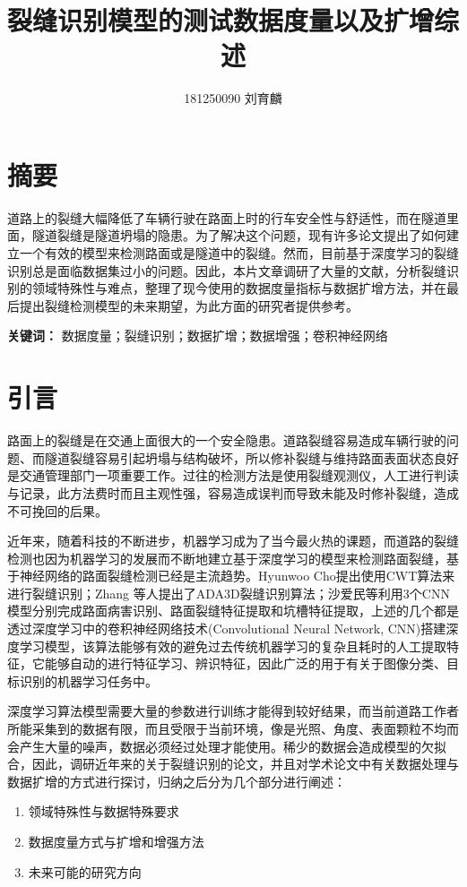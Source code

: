 \documentclass[a4paper,UTF8]{article}
\theoremstyle{definition}
\begin{document}
	\title{裂缝识别模型的测试数据度量以及扩增综述}
	\author{181250090 刘育麟}
	\date{}
	\maketitle
	\section*{摘要}
	道路上的裂缝大幅降低了车辆行驶在路面上时的行车安全性与舒适性，而在隧道里面，隧道裂缝是隧道坍塌的隐患。为了解决这个问题，现有许多论文提出了如何建立一个有效的模型来检测路面或是隧道中的裂缝。然而，目前基于深度学习的裂缝识别总是面临数据集过小的问题。因此，本片文章调研了大量的文献，分析裂缝识别的领域特殊性与难点，整理了现今使用的数据度量指标与数据扩增方法，并在最后提出裂缝检测模型的未来期望，为此方面的研究者提供参考。
	
	\textbf{关键词：} 数据度量；裂缝识别；数据扩增；数据增强；卷积神经网络
	
	\section{引言}
	路面上的裂缝是在交通上面很大的一个安全隐患。道路裂缝容易造成车辆行驶的问题、而隧道裂缝容易引起坍塌与结构破坏，所以修补裂缝与维持路面表面状态良好是交通管理部门一项重要工作。过往的检测方法是使用裂缝观测仪，人工进行判读与记录，此方法费时而且主观性强，容易造成误判而导致未能及时修补裂缝，造成不可挽回的后果\cite{2}。
	
	近年来，随着科技的不断进步，机器学习成为了当今最火热的课题，而道路的裂缝检测也因为机器学习的发展而不断地建立基于深度学习的模型来检测路面裂缝，基于神经网络的路面裂缝检测已经是主流趋势。Hyunwoo Cho提出使用CWT算法来进行裂缝识别\cite{3}；Zhang 等人提出了ADA3D裂缝识别算法\cite{4}；沙爱民等利用3个CNN模型分别完成路面病害识别、路面裂缝特征提取和坑槽特征提取\cite{5}，上述的几个都是透过深度学习中的卷积神经网络技术(Convolutional Neural Network, CNN)搭建深度学习模型，该算法能够有效的避免过去传统机器学习的复杂且耗时的人工提取特征，它能够自动的进行特征学习、辨识特征，因此广泛的用于有关于图像分类、目标识别的机器学习任务中。
	
	深度学习算法模型需要大量的参数进行训练才能得到较好结果，而当前道路工作者所能采集到的数据有限，而且受限于当前环境，像是光照、角度、表面颗粒不均而会产生大量的噪声，数据必须经过处理才能使用。稀少的数据会造成模型的欠拟合，因此，调研近年来的关于裂缝识别的论文，并且对学术论文中有关数据处理与数据扩增的方式进行探讨，归纳之后分为几个部分进行阐述：
	\begin{enumerate}[(1)]
		\item 领域特殊性与数据特殊要求
		\item 数据度量方式与扩增和增强方法
		\item 未来可能的研究方向
	\end{enumerate}
	
\end{document}
